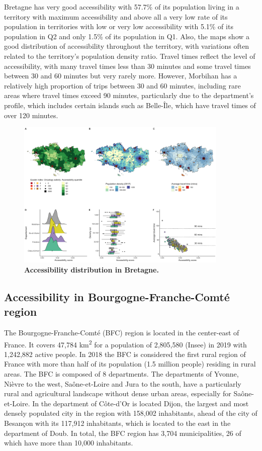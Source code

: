 Bretagne has very good accessibility with 57.7\% of its population living in a
territory with maximum accessibility and above all a very low rate of its
population in territories with low or very low accessibility with 5.1\% of its
population in Q2 and only 1.5\% of its population in Q1. Also, the maps show a
good distribution of accessibility throughout the territory, with variations
often related to the territory's population density ratio. Travel times reflect
the level of accessibility, with many travel times less than 30 minutes and some
travel times between 30 and 60 minutes but very rarely more. However, Morbihan
has a relatively high proportion of trips between 30 and 60 minutes, including
rare areas where travel times exceed 90 minutes, particularly due to the
department's profile, which includes certain islands such as Belle-Île, which
have travel times of over 120 minutes.


\begin{figure}[H]
    \includegraphics[width=0.9\textwidth]{images/camion/region_accessibility/accessibility_Bretagne.png}
    \centering
    \caption{
        \textbf{Accessibility distribution in Bretagne.}
    }
\end{figure}

\subsection*{Accessibility in Bourgogne-Franche-Comté region}

The Bourgogne-Franche-Comté (BFC) region is located in the center-east of
France. It covers 47,784 km\textsuperscript{2} for a population of 2,805,580
(Insee) in 2019 with 1,242,882 active people. In 2018 the BFC is considered the
first rural region of France with more than half of its population (1.5 million
people) residing in rural areas. The BFC is composed of 8 departments. The
departments of Yvonne, Nièvre to the west, Saône-et-Loire and Jura to the south,
have a particularly rural and agricultural landscape without dense urban areas,
especially for Saône-et-Loire.  In the department of Côte-d'Or is located Dijon,
the largest and most densely populated city in the region with 158,002
inhabitants, ahead of the city of Besançon with its 117,912 inhabitants, which
is located to the east in the department of Doub. In total, the BFC region has
3,704 municipalities, 26 of which have more than 10,000 inhabitants.

